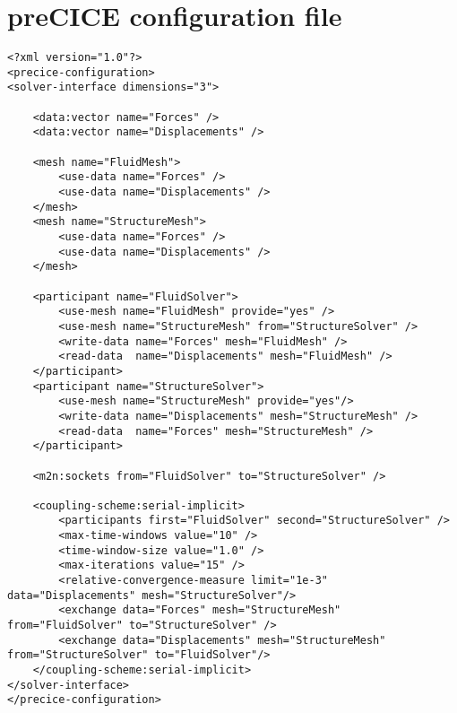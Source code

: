 \chapter{preCICE configuration file}
\label{app:pc-config-file}

\lstset{language=XML}
\begin{lstlisting}[caption=preCICE configuration file example]
<?xml version="1.0"?>
<precice-configuration>
<solver-interface dimensions="3">
	
	<data:vector name="Forces" />
	<data:vector name="Displacements" />
	
	<mesh name="FluidMesh">
		<use-data name="Forces" />
		<use-data name="Displacements" />
	</mesh>
	<mesh name="StructureMesh">
		<use-data name="Forces" />
		<use-data name="Displacements" />
	</mesh>
	
	<participant name="FluidSolver">
		<use-mesh name="FluidMesh" provide="yes" />
		<use-mesh name="StructureMesh" from="StructureSolver" />
		<write-data name="Forces" mesh="FluidMesh" />
		<read-data  name="Displacements" mesh="FluidMesh" />
	</participant>
	<participant name="StructureSolver">
		<use-mesh name="StructureMesh" provide="yes"/>
		<write-data name="Displacements" mesh="StructureMesh" />
		<read-data  name="Forces" mesh="StructureMesh" />
	</participant>
	
	<m2n:sockets from="FluidSolver" to="StructureSolver" />

	<coupling-scheme:serial-implicit>
		<participants first="FluidSolver" second="StructureSolver" />
		<max-time-windows value="10" />
		<time-window-size value="1.0" />
		<max-iterations value="15" />
		<relative-convergence-measure limit="1e-3" data="Displacements" mesh="StructureSolver"/>
		<exchange data="Forces" mesh="StructureMesh" from="FluidSolver" to="StructureSolver" />
		<exchange data="Displacements" mesh="StructureMesh" from="StructureSolver" to="FluidSolver"/>
	</coupling-scheme:serial-implicit>
</solver-interface>
</precice-configuration>
\end{lstlisting}





